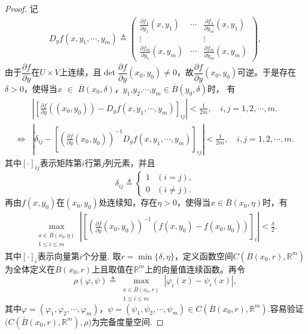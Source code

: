 \documentclass[../../main.tex]{subfiles}%
\begin{document}
\begin{proof}
记
\begin{align*}
D_y f(x, y_1, \cdots, y_m) \triangleq \begin{pmatrix}
\frac{\partial f_1}{\partial y_1}(x,y_1)&\cdots&\frac{\partial f_1}{\partial y_m}(x,y_1)\\
\vdots&&\vdots\\
\frac{\partial f_m}{\partial y_1}(x,y_m)&\cdots&\frac{\partial f_m}{\partial y_m}(x,y_m)
\end{pmatrix},
\end{align*}
由于$\dfrac{\partial f}{\partial y}$在$U\times V$上连续，且$\det\dfrac{\partial f}{\partial y}(x_0,y_0)\neq 0$，故$\dfrac{\partial f}{\partial y}(x_0,y_0)$可逆。于是存在$\delta>0$，使得当$x$ $\in$ $\overline{B}(x_0,\delta)$，$y_1$,$y_2$,$\cdots$,$y_m\in\overline{B}(y_0,\delta)$时，
有
\begin{align}
&\left| \left[ \frac{\partial f}{\partial y}\left( (x_0,y_0) \right)-D_yf\left( x,y_1,\cdots ,y_m \right)\right] _{ij} \right|<\frac{1}{2m},\quad i,j=1,2,\cdots ,m.
\nonumber \\
\Longleftrightarrow &\left| \delta _{ij}-\left[ \left( \frac{\partial f}{\partial y}(x_0,y_0) \right) ^{-1}D_yf(x,y_1,\cdots ,y_m) \right] _{ij} \right|<\frac{1}{2m},\quad i,j=1,2,\cdots ,m.
\label{eq:::111616156}
\end{align}
其中$[\cdot]_{ij}$表示矩阵第$i$行第$j$列元素，并且
\[
\delta_{ij} \triangleq \begin{cases} 
1 & (i = j), \\
0 & (i \neq j).
\end{cases}
\]
再由$f(x,y_0)$在$(x_0,y_0)$处连续知，存在$\eta>0$，使得当$x\in\overline{B}(x_0,\eta)$时，有
\begin{align}\label{eq::0j90qij390UFORJFJAWJ}
\max_{\substack{x \in \overline{B}(x_0, \eta) \\ 1 \leqslant i \leqslant m}} \left| \left[ \left( \frac{\partial f}{\partial y}(x_0, y_0) \right)^{-1} (f(x, y_0) - f(x_0, y_0)) \right]_i \right| < \frac{\delta}{2}.
\end{align}
其中$[\cdot]_{i}$表示向量第$i$个分量.
取$r=\min\{\delta,\eta\}$，定义函数空间$C\left(\overline{B}(x_0, r), \mathbb{R}^m\right)$为全体定义在$\overline{B}(x_0, r)$上且取值在$\mathbb{R}^m$上的向量值连续函数。再令
\[
\rho(\varphi, \psi) \triangleq \max_{\substack{x \in \overline{B}(x_0, r) \\ 1 \leqslant i \leqslant m}} |\varphi_i(x) - \psi_i(x)|,
\]
其中$\varphi = (\varphi_1, \varphi_2, \cdots, \varphi_m)$，$\psi = (\psi_1, \psi_2, \cdots, \psi_m)\in C\left(\overline{B}(x_0, r), \mathbb{R}^m\right)$.容易验证$\big(C(\overline{B}(x_0,r),\mathbb{R}^m),\rho\big)$为完备度量空间.


\end{proof}
\end{document}
